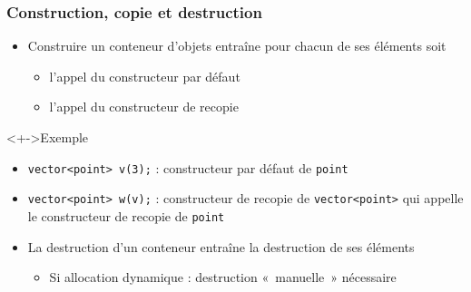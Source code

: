 \begin{frame}
\frametitle{Construction, copie et destruction}
\begin{itemize}[<+->]
\item Construire un conteneur d'objets entraîne pour chacun de ses éléments soit
	\begin{itemize}
	\item l'appel du constructeur par défaut 
	\item l'appel du constructeur de recopie
	\end{itemize}
\end{itemize}
\begin{exampleblock}<+->{Exemple}
	\begin{itemize}[<+->]
	\item \lstinline|vector<point> v(3);| : constructeur par défaut de \texttt{point}
	\item \lstinline|vector<point> w(v);| : constructeur de recopie de \texttt{vector<point>} qui appelle le constructeur de recopie de \texttt{point}
	\end{itemize}
\end{exampleblock}
\begin{itemize}[<+->]
\item La destruction d'un conteneur entraîne la destruction de ses éléments
	\begin{itemize}
	\item Si allocation dynamique : destruction «~manuelle~» nécessaire
	\end{itemize}
\end{itemize}
\end{frame}

